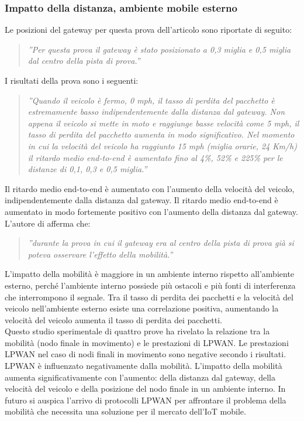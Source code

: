 \documentclass[a4paper]{report} %
\begin{document}
\subsubsection{Impatto della distanza, ambiente mobile esterno}
Le posizioni del gateway per questa prova dell'articolo \cite{art:rif.47} sono riportate di seguito:
\begin{quote}
	\textit{''Per questa prova il gateway è stato posizionato a 0,3 miglia e 0,5 miglia dal centro della pista di prova.''}
\end{quote}
I risultati della prova sono i seguenti:
\begin{quote}
	\textit{''Quando il veicolo è fermo, 0 mph, il tasso di perdita del pacchetto è estremamente basso indipendentemente dalla distanza dal gateway. Non appena il veicolo si mette in moto e raggiunge basse velocità come 5 mph, il tasso di perdita del pacchetto aumenta in modo significativo.
	Nel momento in cui la velocità del veicolo ha raggiunto 15 mph (miglia orarie, 24 Km/h) il ritardo medio end-to-end è aumentato fino al 4\%, 52\% e 225\% per le distanze di 0,1, 0,3 e 0,5 miglia.''}
\end{quote}
Il ritardo medio end-to-end è aumentato con l'aumento della velocità del veicolo, indipendentemente dalla distanza dal gateway. Il ritardo medio end-to-end è aumentato in modo fortemente positivo con l'aumento della distanza dal gateway. 
L'autore di \cite{art:rif.47} afferma che:
\begin{quote}
	\textit{''durante la prova in cui il gateway era al centro della pista di prova già si poteva osservare l'effetto della mobilità.''}
\end{quote}
L'impatto della mobilità è maggiore in un ambiente interno rispetto all'ambiente esterno, perché l'ambiente interno possiede più ostacoli e più fonti di interferenza che interrompono il segnale. 
Tra il tasso di perdita dei pacchetti e la velocità del veicolo nell'ambiente esterno esiste una correlazione positiva, aumentando la velocità del veicolo aumenta il tasso di perdita dei pacchetti. 
\\
Questo studio sperimentale di quattro prove ha rivelato la relazione tra la mobilità (nodo finale in movimento) e le prestazioni di LPWAN. Le prestazioni LPWAN nel caso di nodi finali in movimento sono negative secondo i risultati. LPWAN è influenzato negativamente dalla mobilità. L'impatto della mobilità aumenta significativamente con l'aumento: della distanza dal gateway, della velocità del veicolo e della posizione del nodo finale in un ambiente interno. In futuro si auspica l'arrivo di protocolli LPWAN per affrontare il problema della mobilità che necessita una soluzione per il mercato dell'IoT mobile.
\end{document}
